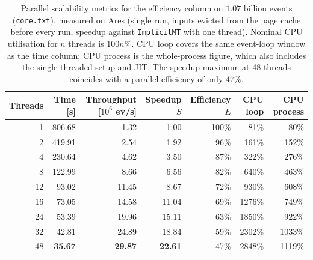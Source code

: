 \begin{table}[htbp]
\centering
\caption{Parallel scalability metrics for the efficiency column on $1.07$ billion events (\texttt{core.txt}), measured on Ares (single run, inputs evicted from the page cache before every run, speedup against \texttt{ImplicitMT} with one thread). Nominal CPU utilisation for $n$ threads is $100n\%$. CPU loop covers the same event-loop window as the time column; CPU process is the whole-process figure, which also includes the single-threaded setup and JIT. The speedup maximum at 48 threads coincides with a parallel efficiency of only $47\%$.}
\label{tab:scalability-efficiency}
\begin{tabular}{rrrrrrr}
\toprule
Threads & Time [s] & Throughput [$10^6$ ev/s] & Speedup $S$ & Efficiency $E$ & CPU loop & CPU process \\
\midrule
 1 & 806.68 & 1.32 & 1.00 & 100\% & 81\% & 80\% \\
 2 & 419.91 & 2.54 & 1.92 & 96\% & 161\% & 152\% \\
 4 & 230.64 & 4.62 & 3.50 & 87\% & 322\% & 276\% \\
 8 & 122.99 & 8.66 & 6.56 & 82\% & 640\% & 463\% \\
12 & 93.02 & 11.45 & 8.67 & 72\% & 930\% & 608\% \\
16 & 73.05 & 14.58 & 11.04 & 69\% & 1276\% & 749\% \\
24 & 53.39 & 19.96 & 15.11 & 63\% & 1850\% & 922\% \\
32 & 42.81 & 24.89 & 18.84 & 59\% & 2302\% & 1033\% \\
48 & \textbf{35.67} & \textbf{29.87} & \textbf{22.61} & 47\% & 2848\% & 1119\% \\
\bottomrule
\end{tabular}
\end{table}
